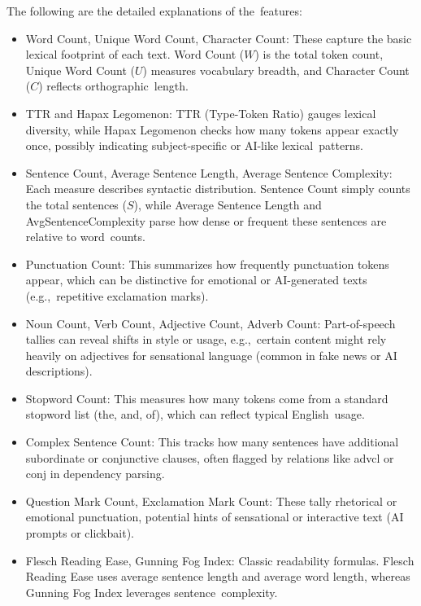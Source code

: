 \documentclass[electronics,article,accept,pdftex,moreauthors,electronics]{Definitions/mdpi}
\begin{document}
The following are the detailed explanations of the~features:
\begin{itemize}
  \item Word Count, Unique Word Count, Character Count:
  These capture the basic lexical footprint of each text. 
  Word Count ($W$) is the total token count, Unique Word Count ($U$) measures vocabulary 
  breadth, and Character Count ($C$) reflects orthographic~length.

  \item TTR and Hapax Legomenon:
  TTR (Type-Token Ratio) gauges lexical diversity, while Hapax Legomenon checks how many tokens appear exactly once, possibly indicating subject-specific or 
  AI-like lexical~patterns.

  \item Sentence Count, Average Sentence Length, Average Sentence Complexity:
  Each measure describes syntactic distribution. 
  Sentence Count simply counts the total sentences ($S$), while Average Sentence Length and AvgSentenceComplexity parse how dense or frequent these sentences are relative to word~counts.

  \item Punctuation Count:
  This summarizes how frequently punctuation tokens appear, which can be distinctive 
  for emotional or AI-generated texts (e.g.,~repetitive exclamation marks).

  \item Noun Count, Verb Count, Adjective Count, Adverb Count:
  Part-of-speech tallies can reveal shifts in style or usage, 
  e.g.,~certain content might rely heavily on adjectives for sensational language (common in fake news or AI descriptions).

  \item Stopword Count:
  This measures how many tokens come from a standard stopword list (the, and, of), which can reflect typical English~usage.

  \item Complex Sentence Count:
  This tracks how many sentences have additional subordinate or conjunctive clauses, often flagged by relations like advcl or conj in dependency parsing.

  \item Question Mark Count, Exclamation Mark Count:
  These tally rhetorical or emotional punctuation, potential hints of sensational or interactive text (AI prompts or clickbait).

  \item Flesch Reading Ease, Gunning Fog Index:
  Classic readability formulas. Flesch Reading Ease uses average sentence length and average word length, whereas Gunning Fog Index leverages sentence~complexity.


\end{itemize}
\end{document}
